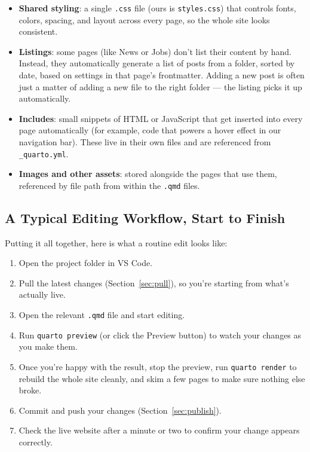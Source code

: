 \documentclass[11pt]{article}
\newcommand{\term}[1]{\textbf{#1}}
\newcommand{\file}[1]{\texttt{#1}}
\newcommand{\cmd}[1]{\texttt{#1}}
\begin{document}
\begin{itemize}
    \item \term{Shared styling}: a single \file{.css} file (ours is
    \file{styles.css}) that controls fonts, colors, spacing, and layout
    across every page, so the whole site looks consistent.
    \item \term{Listings}: some pages (like News or Jobs) don't list their
    content by hand. Instead, they automatically generate a list of posts
    from a folder, sorted by date, based on settings in that page's
    frontmatter. Adding a new post is often just a matter of adding a new
    file to the right folder --- the listing picks it up automatically.
    \item \term{Includes}: small snippets of HTML or JavaScript that get
    inserted into every page automatically (for example, code that
    powers a hover effect in our navigation bar). These live in their own
    files and are referenced from \file{\_quarto.yml}.
    \item \term{Images and other assets}: stored alongside the pages that
    use them, referenced by file path from within the \file{.qmd} files.
\end{itemize}

\subsection{A Typical Editing Workflow, Start to Finish}

Putting it all together, here is what a routine edit looks like:

\begin{enumerate}
    \item Open the project folder in VS Code.
    \item Pull the latest changes (Section~\ref{sec:pull}), so you're
    starting from what's actually live.
    \item Open the relevant \file{.qmd} file and start editing.
    \item Run \cmd{quarto preview} (or click the Preview button) to watch
    your changes as you make them.
    \item Once you're happy with the result, stop the preview, run
    \cmd{quarto render} to rebuild the whole site cleanly, and skim a few
    pages to make sure nothing else broke.
    \item Commit and push your changes (Section~\ref{sec:publish}).
    \item Check the live website after a minute or two to confirm your
    change appears correctly.
\end{enumerate}
\end{document}

